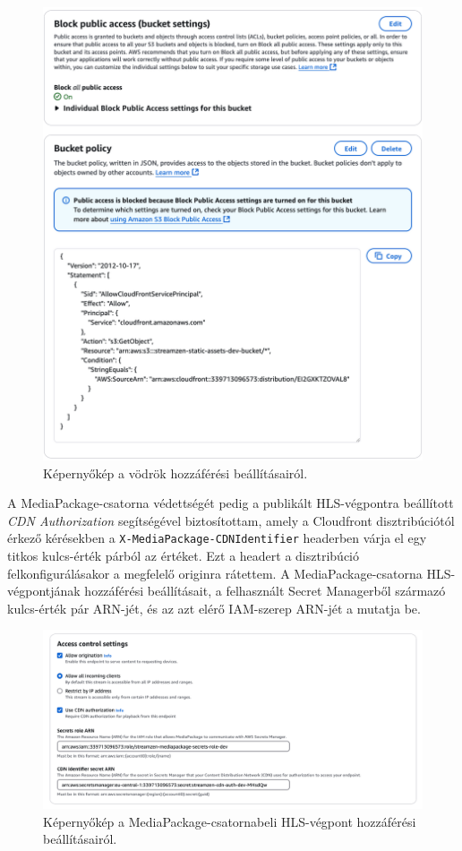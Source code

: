 \begin{figure}[ht]
  \centering
  \includegraphics[width=150mm, keepaspectratio]{figures/distro_s3policy.png}
  \caption{Képernyőkép a vödrök hozzáférési beállításairól.}
  \label{fig:s3policy}
\end{figure}

A MediaPackage-csatorna védettségét pedig a publikált HLS-végpontra beállított \emph{CDN Authorization}\cite{cdnauth} segítségével biztosítottam, amely a Cloudfront disztribúciótól érkező kérésekben a \verb|X-MediaPackage-CDNIdentifier| headerben várja el egy titkos kulcs-érték párból az értéket. Ezt a headert a disztribúció felkonfigurálásakor a megfelelő originra rátettem. A MediaPackage-csatorna HLS-végpontjának hozzáférési beállításait, a felhasznált Secret Managerből származó kulcs-érték pár ARN-jét, és az azt elérő IAM-szerep ARN-jét a  mutatja be.

\begin{figure}[ht]
  \centering
  \includegraphics[width=150mm, keepaspectratio]{figures/distro_mediapack.png}
  \caption{Képernyőkép a MediaPackage-csatornabeli HLS-végpont hozzáférési beállításairól.}
  \label{fig:mediapack}
\end{figure}

